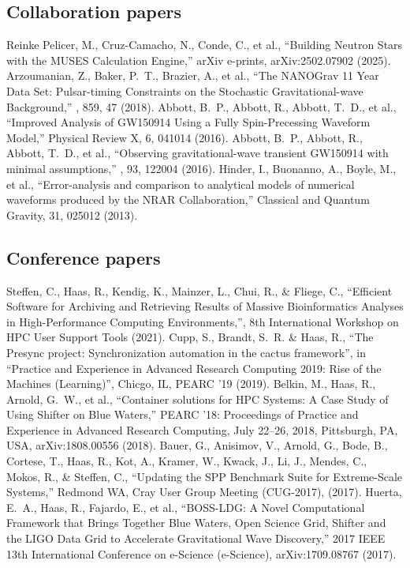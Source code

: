 \subsection{Collaboration papers}
 Reinke Pelicer, M., Cruz-Camacho, N., Conde, C., et al., ``Building Neutron Stars with the MUSES Calculation Engine,'' arXiv e-prints, arXiv:2502.07902 (2025).
 Arzoumanian, Z., Baker, P.~T., Brazier, A., et al., ``The NANOGrav 11 Year Data Set: Pulsar-timing Constraints on the Stochastic Gravitational-wave Background,'' \apj, 859, 47 (2018).
 Abbott, B.~P., Abbott, R., Abbott, T.~D., et al., ``Improved Analysis of GW150914 Using a Fully Spin-Precessing Waveform Model,'' Physical Review X, 6, 041014 (2016).
 Abbott, B.~P., Abbott, R., Abbott, T.~D., et al., ``Observing gravitational-wave transient GW150914 with minimal assumptions,'' \prd, 93, 122004 (2016).
 Hinder, I., Buonanno, A., Boyle, M., et al., ``Error-analysis and comparison to analytical models of numerical waveforms produced by the NRAR Collaboration,'' Classical and Quantum Gravity, 31, 025012 (2013).

\subsection{Conference papers}
 Steffen, C., Haas, R., Kendig, K., Mainzer, L., Chui, R., \& Fliege, C., ``Efficient Software for Archiving and Retrieving Results of Massive Bioinformatics Analyses in High-Performance Computing Environments,'', 8th International Workshop on HPC User Support Tools (2021).
 Cupp, S., Brandt, S.~R. \& Haas, R., ``The Presync project: Synchronization automation in the cactus framework'', in ``Practice and Experience in Advanced Research Computing 2019: Rise of the Machines (Learning)'', Chicgo, IL, PEARC '19 (2019).
 Belkin, M., Haas, R., Arnold, G.~W., et al., ``Container solutions for HPC Systems: A Case Study of Using Shifter on Blue Waters,'' PEARC '18: Proceedings of Practice and Experience in Advanced Research Computing, July 22--26, 2018, Pittsburgh, PA, USA, arXiv:1808.00556 (2018).
 Bauer, G., Anisimov, V., Arnold, G., Bode, B., Cortese, T., Haas, R., Kot, A., Kramer, W., Kwack, J., Li, J., Mendes, C., Mokos, R., \& Steffen, C., ``Updating the SPP Benchmark Suite for Extreme-Scale Systems,'' Redmond WA, Cray User Group Meeting (CUG-2017), (2017).
 Huerta, E.~A., Haas, R., Fajardo, E., et al., ``BOSS-LDG: A Novel Computational Framework that Brings Together Blue Waters, Open Science Grid, Shifter and the LIGO Data Grid to Accelerate Gravitational Wave Discovery,'' 2017 IEEE 13th International Conference on e-Science (e-Science), arXiv:1709.08767 (2017).


